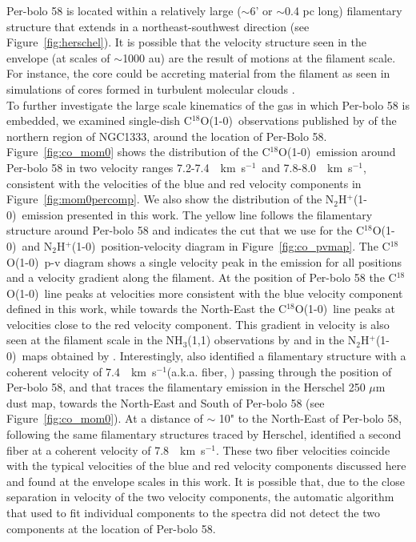 \documentclass[iop]{emulateapj}
\newcommand{\kms}{\,~km~s$^{-1}$}
\newcommand{\nthp}{\mbox{\rm N$_2$H$^+$(1-0)}}
\newcommand{\ceo}{\mbox{\rm C$^{18}$O(1-0)}}
\begin{document}
Per-bolo 58 is located within a relatively large ($\sim$6' or $\sim$0.4 pc long) filamentary structure that extends in a northeast-southwest direction (see Figure~\ref{fig:herschel}). It is possible that the velocity structure seen in the envelope (at scales of $\sim$1000 au) are the result of motions at the filament scale. For instance, the core could be accreting material from the filament as seen in simulations of cores formed in turbulent molecular clouds \citep{2011SmithQuantification}. \\

To further investigate the large scale kinematics of the gas in which Per-bolo 58 is embedded, we examined single-dish \ceo\ observations published by \cite{2003RidgeSurvey} of the northern region of NGC1333, around the location of Per-Bolo 58. Figure~\ref{fig:co_mom0} shows the distribution of the \ceo\ emission around Per-bolo 58 in two velocity ranges 7.2-7.4 \kms\ and 7.8-8.0 \kms, consistent with the velocities of the blue and red velocity components in Figure~\ref{fig:mom0percomp}. We also show the distribution of the \nthp\ emission presented in this work. The yellow line follows the filamentary structure around Per-bolo 58 and indicates the cut that we use for the \ceo\ and \nthp\ position-velocity diagram in Figure~\ref{fig:co_pvmap}. The \ceo\ p-v diagram shows a single velocity peak in the emission for all positions and a velocity gradient along the filament. At the position of Per-bolo 58 the \ceo\ line peaks at velocities more consistent with the blue velocity component defined in this work, while towards the North-East the \ceo\ line peaks at velocities close to the red velocity component. This gradient in velocity is also seen at the filament scale in the  NH$_3$(1,1) observations by \cite{2017FriesenGreen} and in the \nthp\ maps obtained by \cite{2017HacarFibers}. Interestingly, \cite{2017HacarFibers} also identified a filamentary structure with a coherent velocity of 7.4 \kms (a.k.a. fiber, \citealt{2011HacarDense}) passing through the position of Per-bolo 58, and that traces the filamentary emission in the Herschel 250 $\mu$m dust map,  towards the North-East and South of Per-bolo 58 (see Figure~\ref{fig:co_mom0}). At a distance of $\sim$ 10" to the North-East of Per-bolo 58, following the same filamentary structures traced by Herschel, \cite{2017HacarFibers} identified a second fiber at a coherent velocity of 7.8 \kms. These two fiber velocities coincide with the typical velocities of the blue and red velocity components discussed here and found at the envelope scales in this work. It is possible that, due to the close separation in velocity of the two velocity components, the automatic algorithm that \cite{2017HacarFibers} used to fit individual components to the spectra did not detect the two components at the location of Per-bolo 58.\\
\end{document}
